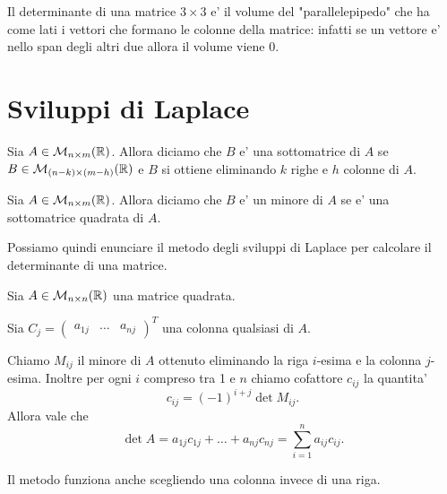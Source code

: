 Il determinante di una matrice $3 \times 3$ e' il volume del "parallelepipedo" che ha come lati i vettori che formano le colonne della matrice: infatti se un vettore e' nello span degli altri due allora il volume viene 0.

\section{Sviluppi di Laplace}

\begin{definition}
    Sia $A \in \mathcal{M}_{n\times m}(\mathbb{R})$. Allora diciamo che $B$ e' una sottomatrice di $A$ se $B \in \mathcal{M}_{(n-k) \times (m-h)}(\mathbb{R})$ e $B$ si ottiene eliminando $k$ righe e $h$ colonne di $A$.
\end{definition}

\begin{definition}
    Sia $A \in \mathcal{M}_{n\times m}(\mathbb{R})$. Allora diciamo che $B$ e' un minore di $A$ se e' una sottomatrice quadrata di $A$.
\end{definition}

Possiamo quindi enunciare il metodo degli sviluppi di Laplace per calcolare il determinante di una matrice.

\begin{theorem}
    Sia $A \in \mathcal{M}_{n \times n}(\mathbb{R})$ una matrice quadrata. 
    
    Sia $C_j = \begin{pmatrix}
        a_{1j} & \dots & a_{nj}
    \end{pmatrix}^T$ una colonna qualsiasi di $A$. 
    
    Chiamo $M_{ij}$ il minore di $A$ ottenuto eliminando la riga $i$-esima e la colonna $j$-esima. Inoltre per ogni $i$ compreso tra 1 e $n$ chiamo cofattore $c_{ij}$ la quantita' \[
        c_{ij} = (-1)^{i+j} \det M_{ij}.
    \]
    Allora vale che \begin{equation}
        \det A = a_{1j}c_{1j} + \dots + a_{nj}c_{nj} = \sum_{i = 1}^n a_{ij}c_{ij}.
    \end{equation}
\end{theorem}

Il metodo funziona anche scegliendo una colonna invece di una riga.

